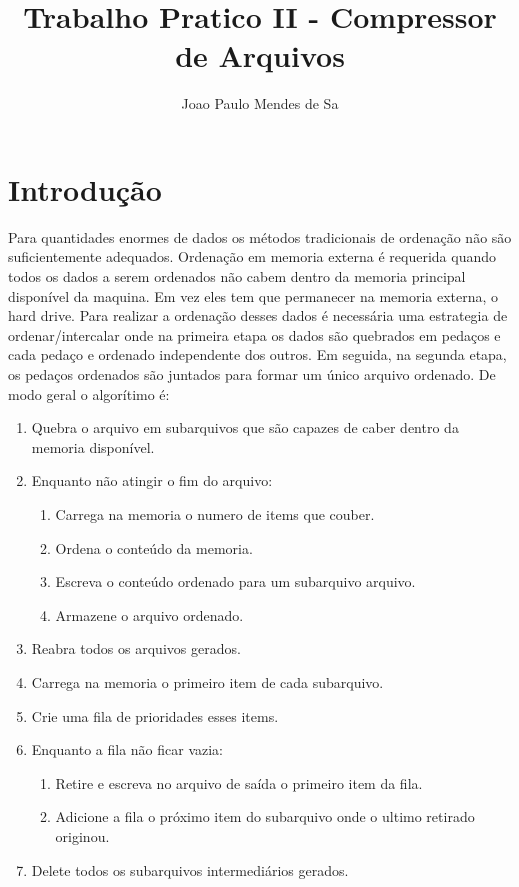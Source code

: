 \documentclass[a4paper, 11pt]{article}
\begin{document}
\title{Trabalho Pratico II - Compressor de Arquivos}
\author{Joao Paulo Mendes de Sa}
\date{}
\maketitle

\section{Introdução}
Para quantidades enormes de dados os métodos tradicionais de ordenação não são suficientemente adequados. Ordenação em memoria externa é requerida quando todos os dados a serem ordenados não cabem dentro da memoria principal disponível da maquina. Em vez eles tem que permanecer na memoria externa, o hard drive. Para realizar a ordenação desses dados é necessária uma estrategia de ordenar/intercalar onde na primeira etapa os dados são quebrados em pedaços e cada pedaço e ordenado independente dos outros. Em seguida, na segunda etapa, os pedaços ordenados são juntados para formar um único arquivo ordenado. De modo geral o algorítimo é:

\begin{enumerate}
\item Quebra o arquivo em subarquivos que são capazes de caber dentro da memoria disponível.
\item Enquanto não atingir o fim do arquivo:
\begin{enumerate}
\item Carrega na memoria o numero de items que couber.
\item Ordena o conteúdo da memoria.
\item Escreva o conteúdo ordenado para um subarquivo arquivo.
\item Armazene o arquivo ordenado.
\end{enumerate}
\item Reabra todos os arquivos gerados.
\item Carrega na memoria o primeiro item de cada subarquivo.
\item Crie uma fila de prioridades esses items.
\item Enquanto a fila não ficar vazia:
\begin{enumerate}
\item Retire e escreva no arquivo de saída o primeiro item da fila.
\item Adicione a fila o próximo item do subarquivo onde o ultimo retirado originou.
\end{enumerate}
\item Delete todos os subarquivos intermediários gerados.
\end{enumerate}
\end{document}
